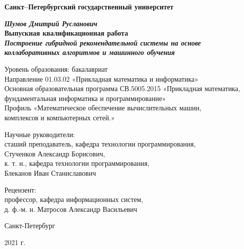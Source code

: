 \begin{titlepage}
\begin{center}

\textbf{Санкт--Петербургский}
\textbf{государственный университет}

\vspace{35mm}

\textbf{\textit{\large Шумов Дмитрий Русланович}} \\[8mm]

\textbf{\large Выпускная квалификационная работа}\\[3mm]
\textbf{\textit{\large Построение гибридной рекомендательной системы на основе коллаборативных алгоритмов и машинного обучения}}

\vspace{20mm}
Уровень образования: бакалавриат\\
Направление 01.03.02 «Прикладная математика и информатика»\\
Основная образовательная программа СВ.5005.2015
«Прикладная математика, фундаментальная информатика и программирование»\\
Профиль «Математическое обеспечение вычислительных машин,\\ комплексов и компьютерных сетей.»\\[20mm]


\begin{flushright}
{Научные руководители:} \\
сташий преподаватель, кафедра технологии программирования,\\Стученков Александр Борисович, \\
к. т. н., кафедра технологии программирования,\\Блеканов Иван Станиславович
\end{flushright}
\begin{flushright}
{Рецензент:} \\
профессор, кафедра информационных систем,\\д. ф.-м. н. Матросов Александр Васильевич
\end{flushright}

\vfill 

{Санкт-Петербург}
\par{2021 г.}
\end{center}
\end{titlepage}
\restoregeometry
\addtocounter{page}{1}